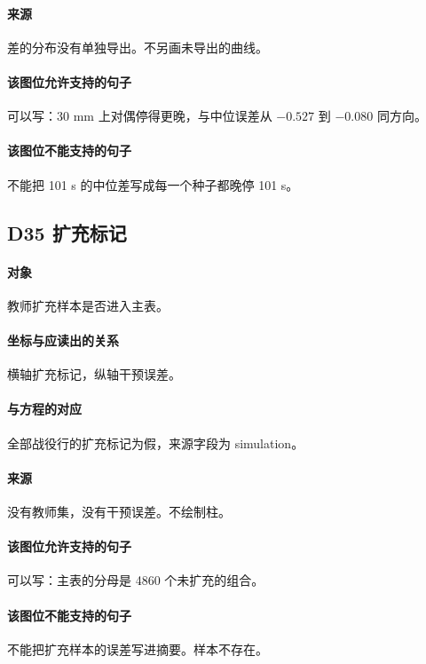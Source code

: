 \paragraph{来源}
差的分布没有单独导出。不另画未导出的曲线。

\paragraph{该图位允许支持的句子}
可以写：30 mm 上对偶停得更晚，与中位误差从 $-0.527$ 到 $-0.080$ 同方向。

\paragraph{该图位不能支持的句子}
不能把 101 s 的中位差写成每一个种子都晚停 101 s。

\subsection{D35 扩充标记}
\paragraph{对象}
教师扩充样本是否进入主表。

\paragraph{坐标与应读出的关系}
横轴扩充标记，纵轴干预误差。

\paragraph{与方程的对应}
全部战役行的扩充标记为假，来源字段为 simulation。

\paragraph{来源}
没有教师集，没有干预误差。不绘制柱。

\paragraph{该图位允许支持的句子}
可以写：主表的分母是 4860 个未扩充的组合。

\paragraph{该图位不能支持的句子}
不能把扩充样本的误差写进摘要。样本不存在。

